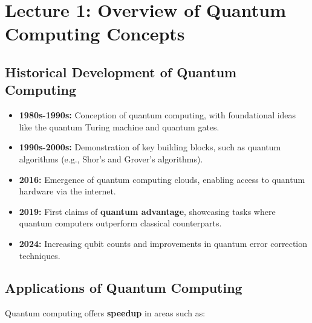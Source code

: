 \section{Lecture 1: Overview of Quantum Computing Concepts}\label{sec:lecture1}

\subsection*{Historical Development of Quantum Computing}
\begin{itemize}
  \item \textbf{1980s-1990s:} Conception of quantum computing, with
    foundational ideas like the quantum Turing machine and quantum gates.

  \item \textbf{1990s-2000s:} Demonstration of key building blocks, such as
    quantum algorithms (e.g., Shor's and Grover's algorithms).

  \item \textbf{2016:} Emergence of quantum computing clouds, enabling
    access to quantum hardware via the internet.

  \item \textbf{2019:} First claims of \textbf{quantum advantage},
    showcasing tasks where quantum computers outperform classical
    counterparts.

  \item \textbf{2024:} Increasing qubit counts and improvements in quantum
    error correction techniques.

\end{itemize}

\subsection*{Applications of Quantum Computing}

Quantum computing offers \textbf{speedup} in areas such as:

